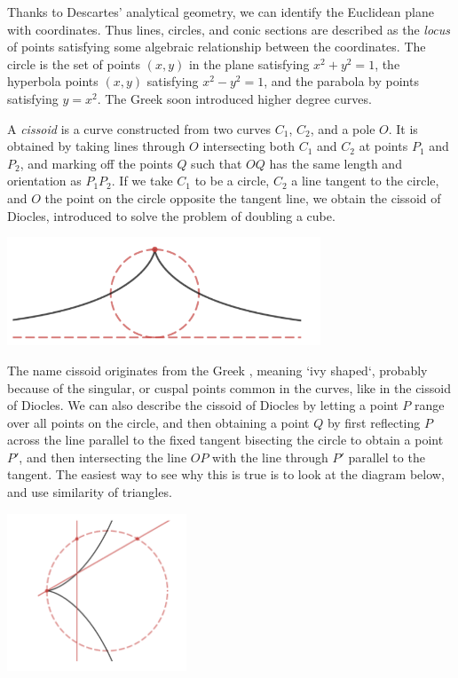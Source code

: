 Thanks to Descartes' analytical geometry, we can identify the Euclidean plane with coordinates. Thus lines, circles, and conic sections are described as the {\it locus} of points satisfying some algebraic relationship between the coordinates. The circle is the set of points $(x,y)$ in the plane satisfying $x^2 + y^2 = 1$, the hyperbola points $(x,y)$ satisfying $x^2 - y^2 = 1$, and the parabola by points satisfying $y = x^2$. The Greek soon introduced higher degree curves.

\begin{example}
    A \emph{cissoid} is a curve constructed from two curves $C_1$, $C_2$, and a pole $O$. It is obtained by taking lines through $O$ intersecting both $C_1$ and $C_2$ at points $P_1$ and $P_2$, and marking off the points $Q$ such that $OQ$ has the same length and orientation as $P_1P_2$. If we take $C_1$ to be a circle, $C_2$ a line tangent to the circle, and $O$ the point on the circle opposite the tangent line, we obtain the cissoid of Diocles, introduced to solve the problem of doubling a cube.
    \begin{center}
    \includegraphics[width=0.7\textwidth]{CissoidDiocles}
    \end{center}
    The name cissoid originates from the Greek \textkappa \textiota \textsigma \textsigma \textomikron \textepsilon \textiota \textdelta \texteta \textvarsigma, meaning `ivy shaped`, probably because of the singular, or cuspal points common in the curves, like in the cissoid of Diocles. We can also describe the cissoid of Diocles by letting a point $P$ range over all points on the circle, and then obtaining a point $Q$ by first reflecting $P$ across the line parallel to the fixed tangent bisecting the circle to obtain a point $P'$, and then intersecting the line $OP$ with the line through $P'$ parallel to the tangent. The easiest way to see why this is true is to look at the diagram below, and use similarity of triangles.
    \begin{center}
        \includegraphics[width=0.4\textwidth]{CissoidDiocles2}

\end{center}
\end{example}
